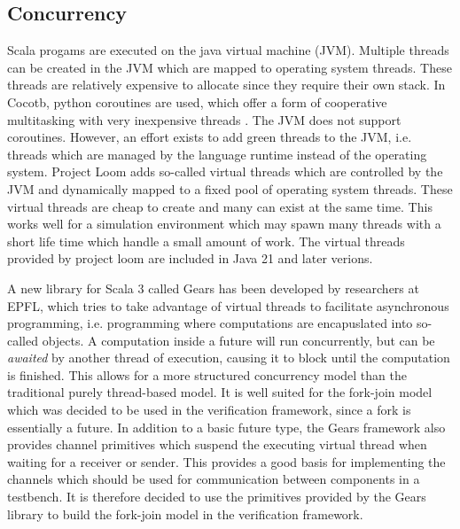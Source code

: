 \subsection{Concurrency} %

Scala progams are executed on the java virtual machine (JVM). Multiple threads can be created in the JVM which are
mapped to operating system threads. These threads are relatively expensive to allocate since they require their own
stack. In Cocotb, python coroutines are used, which offer a form of cooperative multitasking with very inexpensive
threads \cite{pycoroutines}. The JVM does not support coroutines. However, an effort exists to add green threads to
the JVM, i.e. threads which are managed by the language runtime instead of the operating system. Project Loom
\cite{loom} adds so-called virtual threads which are controlled by the JVM and dynamically mapped to a fixed pool of
operating system threads. These virtual threads are cheap to create and many can exist at the same time. This works
well for a simulation environment which may spawn many threads with a short life time which handle a small amount of
work. The virtual threads provided by project loom are included in Java 21 and later verions.

A new library for Scala 3 called Gears \cite{gears} has been developed by researchers at EPFL, which tries to take
advantage of virtual threads to facilitate asynchronous programming, i.e. programming where computations are
encapuslated into so-called  objects. A computation inside a future will run concurrently, but can be
\textit{awaited} by another thread of execution, causing it to block until the computation is finished. This allows
for a more structured concurrency model than the traditional purely thread-based model. It is well suited for the
fork-join model which was decided to be used in the verification framework, since a fork is essentially a future. In
addition to a basic future type, the Gears framework also provides channel primitives which suspend the executing
virtual thread when waiting for a receiver or sender. This provides a good basis for implementing the channels which
should be used for communication between components in a testbench. It is therefore decided to use the primitives
provided by the Gears library to build the fork-join model in the verification framework.

